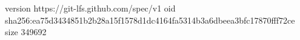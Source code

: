 version https://git-lfs.github.com/spec/v1
oid sha256:ea75d3434851b2b28a15f1578d1dc4164fa5314b3a6dbeea3bfc17870fff72ce
size 349692
